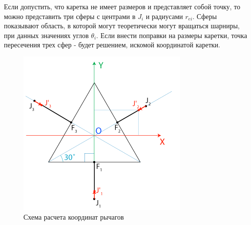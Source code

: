 Если допустить, что каретка не имеет размеров и представляет собой точку, то можно представить три сферы с центрами в $J_{i}$ и радиусами $r_{ei}$. Сферы показывают область, в которой могут теоретически могут вращаться шарниры, при данных значениях углов $\theta_{i}$. Если внести поправки на размеры каретки, точка пересечения трех сфер - будет решением, искомой координатой каретки.
\begin{figure}[h]
	\centering
	\includegraphics[width=0.4\linewidth]{./image/primay}
	\caption{Схема расчета координат рычагов}
\end{figure}

